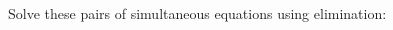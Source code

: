 \question Solve these pairs of simultaneous equations using elimination:\is
\begin{multicols}{2}\ms %
\end{multicols}
